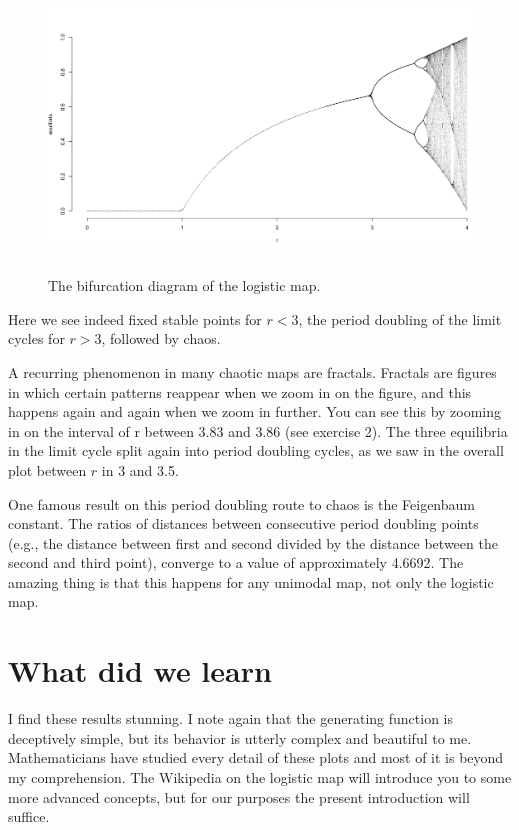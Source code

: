 \documentclass[
  letterpaper,
]{scrbook}
\begin{document}
\begin{figure}

{\centering \includegraphics[width=5.36994in,height=3.01658in]{media/ch2/image8.jpg}

}

\caption{\label{fig-ch2-img8}The bifurcation diagram of the logistic
map.}

\end{figure}

Here we see indeed fixed stable points for \(r < 3\), the period
doubling of the limit cycles for \(r > 3\), followed by chaos.

A recurring phenomenon in many chaotic maps are fractals. Fractals are
figures in which certain patterns reappear when we zoom in on the
figure, and this happens again and again when we zoom in further. You
can see this by zooming in on the interval of r between 3.83 and 3.86
(see exercise 2). The three equilibria in the limit cycle split again
into period doubling cycles, as we saw in the overall plot between \(r\)
in 3 and 3.5.

One famous result on this period doubling route to chaos is the
Feigenbaum constant. The ratios of distances between consecutive period
doubling points (e.g., the distance between first and second divided by
the distance between the second and third point), converge to a value of
approximately 4.6692. The amazing thing is that this happens for any
unimodal map, not only the logistic map.

\hypertarget{what-did-we-learn}{%
\section{What did we learn}\label{what-did-we-learn}}

I find these results stunning. I note again that the generating function
is deceptively simple, but its behavior is utterly complex and beautiful
to me. Mathematicians have studied every detail of these plots and most
of it is beyond my comprehension. The Wikipedia on the logistic map will
introduce you to some more advanced concepts, but for our purposes the
present introduction will suffice.
\end{document}
